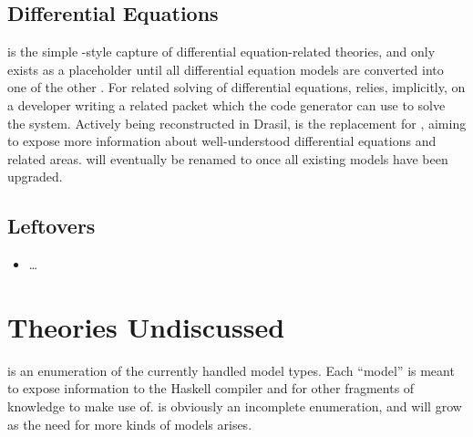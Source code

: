 
\subsection{Differential Equations}

\DEModel{} is the simple \RelationConcept{}-style capture of differential
equation-related theories, and only exists as a placeholder until all
differential equation models are converted into one of the other \ModelKinds{}.
For related solving of differential equations, \DEModel{} relies, implicitly, on
a developer writing a related \ODEInfo{} packet which
the code generator can use to solve the system. Actively being reconstructed in Drasil,
\NewDEModel{} is the replacement for \DEModel{}, aiming to expose more
information about well-understood differential equations and related areas.
\NewDEModel{} will eventually be renamed to \DEModel{} once all existing
\DEModel{} models have been upgraded.


\subsection{Leftovers}


\begin{itemize}

	\item \OthModel{} \ldots{}

\end{itemize}

\section{Theories Undiscussed}

\ModelKinds{} is an enumeration of the currently handled model types. Each
``model'' is meant to expose information to the Haskell compiler and for other
fragments of knowledge to make use of. \ModelKinds{} is obviously an incomplete
enumeration, and will grow as the need for more kinds of models arises.

